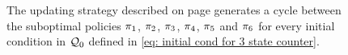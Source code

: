 \begin{figure}[htbp]
    \caption{The updating strategy described on page \pageref{pg: sampling strat 3 states} generates a cycle between the suboptimal policies $\pi_1$, $\pi_2$, $\pi_3$, $\pi_4$, $\pi_5$ and $\pi_6$ for every initial condition in $\mathcal{Q}_0$ defined in \eqref{eq: initial cond for 3 state counter}.}
    \label{fig: explain loop on-policy bias MDP}
\end{figure}